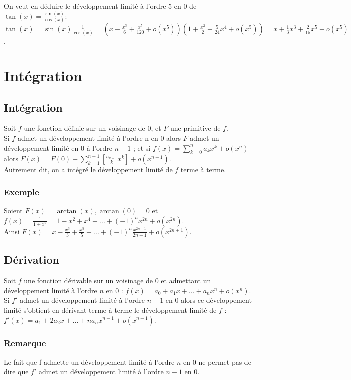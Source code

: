 \documentclass[a4paper,10pt]{book} %
\newcommand{\dl}{développement limité }
\begin{document}
On veut en déduire le \dl à l'ordre 5 en 0 de $\tan(x)=\frac{\sin(x)}{\cos(x)}$:\\

$\tan(x)=\sin(x)\frac{1}{\cos(x)}=(x-\frac{x^3}{6}+\frac{x^5}{120}+o(x^5))(1+\frac{x^2}{2}+\frac{5}{24}x^4+o(x^5))
=x+\frac{1}{3}x^3+\frac{2}{15}x^5+o(x^5)$.

\newpage

\section{Intégration}
\subsection{Intégration}
Soit $f$ une fonction définie sur un voisinage de 0, et $F$ une primitive de $f$.\\
Si $f$ admet un \dl à l'ordre n en 0 alors $F$ admet un \dl en 0 à l'ordre $n+1$ ; et si $\displaystyle f(x)=\sum_{k=0}^na_kx^k+o(x^n)$ alors $\displaystyle F(x)=F(0)+\sum_{k=1}^{n+1}\left[\frac{a_{k-1}}{k}x^k\right]+o(x^{n+1})$.\\

Autrement dit, on a intégré le \dl de $f$ terme à terme.

\subsubsection{Exemple}
Soient $F(x)=\arctan(x), \arctan(0)=0$ et $f(x)=\frac{1}{1+x^2}=1-x^2+x^4+...+(-1)^nx^{2n}+o(x^{2n})$.\\
Ainsi $F(x)=x-\frac{x^3}{3}+\frac{x^5}{5}+... +(-1)^n\frac{x^{2n+1}}{2n+1}+o(x^{2n+1})$.

\subsection{Dérivation}
Soit $f$ une fonction dérivable sur un voisinage de 0 et admettant un \dl à l'ordre $n$ en 0 :
$f(x)=a_0+a_1x+...+a_nx^n+o(x^n)$.\\

Si $f'$ admet un \dl à l'ordre $n-1$ en 0 alors ce \dl s'obtient en dérivant terme à terme le \dl de $f$ : $f'(x)=a_1+2a_2x+...+na_nx^{n-1}+o(x^{n-1})$.

\subsubsection{Remarque}
Le fait que f admette un \dl à l'ordre $n$ en 0 ne permet pas de dire que $f'$ admet un \dl à l'ordre $n-1$ en 0.
\end{document}
